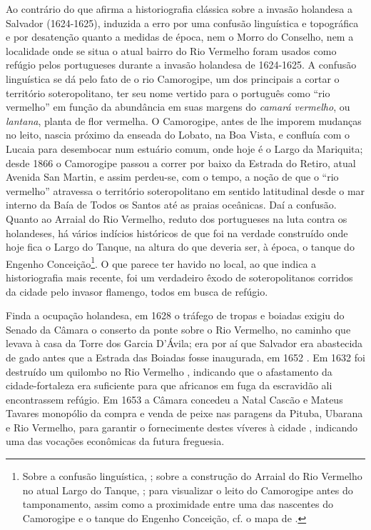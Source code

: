 Ao contrário do que afirma a historiografia clássica sobre a invasão holandesa a Salvador (1624-1625), induzida a erro por uma confusão linguística e topográfica e por desatenção quanto a medidas de época, nem o Morro do Conselho, nem a localidade onde se situa o atual bairro do Rio Vermelho foram usados como refúgio pelos portugueses durante a invasão holandesa de 1624-1625. A confusão linguística se dá pelo fato de o rio Camorogipe, um dos principais a cortar o território soteropolitano, ter seu nome vertido para o português como ``rio vermelho'' em função da abundância em suas margens do \textit{camará vermelho}, ou \textit{lantana}, planta de flor vermelha. O Camorogipe, antes de lhe imporem mudanças no leito, nascia próximo da enseada do Lobato, na Boa Vista, e confluía com o Lucaia para desembocar num estuário comum, onde hoje é o Largo da Mariquita; desde 1866 o Camorogipe passou a correr por baixo da Estrada do Retiro, atual Avenida San Martin, e assim perdeu-se, com o tempo, a noção de que o ``rio vermelho'' atravessa o território soteropolitano em sentido latitudinal desde o mar interno da Baía de Todos os Santos até as praias oceânicas. Daí a confusão. Quanto ao Arraial do Rio Vermelho, reduto dos portugueses na luta contra os holandeses, há vários indícios históricos de que foi na verdade construído onde hoje fica o Largo do Tanque, na altura do que deveria ser, à época, o tanque do Engenho Conceição\footnote{Sobre a confusão linguística, ; sobre a construção do Arraial do Rio Vermelho no atual Largo do Tanque, ; para visualizar o leito do Camorogipe antes do tamponamento, assim como a proximidade entre uma das nascentes do Camorogipe e o tanque do Engenho Conceição, cf. o mapa de .}. O que parece ter havido no local, ao que indica a historiografia mais recente, foi um verdadeiro êxodo de soteropolitanos corridos da cidade pelo invasor flamengo, todos em busca de refúgio.

Finda a ocupação holandesa, em 1628 o tráfego de tropas e boiadas exigiu do Senado da Câmara o conserto da ponte sobre o Rio Vermelho, no caminho que levava à casa da Torre dos Garcia D'Ávila; era por aí que Salvador era abastecida de gado antes que a Estrada das Boiadas fosse inaugurada, em 1652 \cite[pp.~315-316]{azevedo_povoamento_1969}. Em 1632 foi destruído um quilombo no Rio Vermelho \cite[p.~67]{VASCONCELOS2002}, indicando que o afastamento da cidade-fortaleza era suficiente para que africanos em fuga da escravidão ali encontrassem refúgio. Em 1653 a Câmara concedeu a Natal Cascão e Mateus Tavares monopólio da compra e venda de peixe nas paragens da Pituba, Ubarana e Rio Vermelho, para garantir o fornecimente destes víveres à cidade \cite[p.~259]{azevedo_povoamento_1969}, indicando uma das vocações econômicas da futura freguesia.

